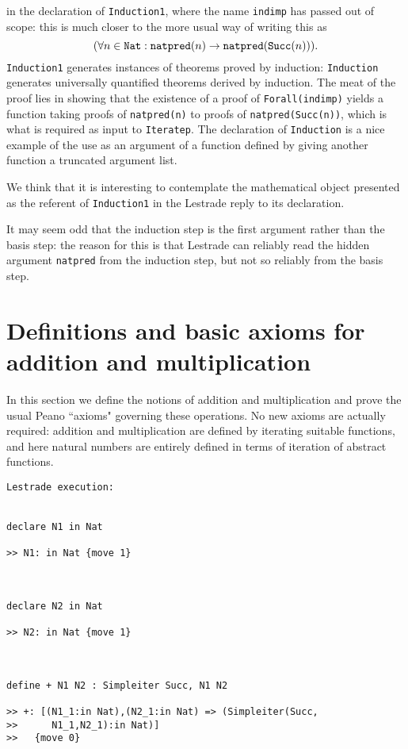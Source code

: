 \documentclass[12pt]{article}
\begin{document}
in the declaration of {\tt Induction1}, where the name {\tt indimp} has passed out of scope:  this is much closer to the more usual way of writing this as $$(\forall n \in {\tt Nat}:{\tt natpred}(n) \rightarrow {\tt natpred}({\tt Succ}(n))).$$  {\tt Induction1} generates instances of theorems proved by induction:  {\tt Induction} generates universally quantified theorems derived by induction.  The meat of the proof lies in showing that the existence of a proof of {\tt Forall(indimp)} yields a function taking proofs of {\tt natpred(n)} to proofs of {\tt natpred(Succ(n))}, which is what is required as input to {\tt Iteratep}.  The declaration of {\tt Induction} is a nice example of the use as an argument of a function defined by giving another function a truncated argument list.

We think that it is interesting to contemplate the mathematical object presented as the referent of {\tt Induction1} in the Lestrade reply to its declaration.

It may seem odd that the induction step is the first argument rather than the basis step:  the reason for this is that Lestrade can reliably read the hidden argument {\tt natpred} from the induction step, but not so reliably from the basis step.

\section{Definitions and basic axioms for addition and multiplication}

In this section we define the notions of addition and multiplication and prove the usual Peano ``axioms" governing these operations.  No new axioms are actually required:  addition and multiplication are defined by iterating suitable functions,
and here natural numbers are entirely defined in terms of iteration of abstract functions.

\begin{verbatim}Lestrade execution:


declare N1 in Nat

>> N1: in Nat {move 1}



declare N2 in Nat

>> N2: in Nat {move 1}



define + N1 N2 : Simpleiter Succ, N1 N2

>> +: [(N1_1:in Nat),(N2_1:in Nat) => (Simpleiter(Succ,
>>      N1_1,N2_1):in Nat)]
>>   {move 0}


\end{verbatim}
\end{document}
